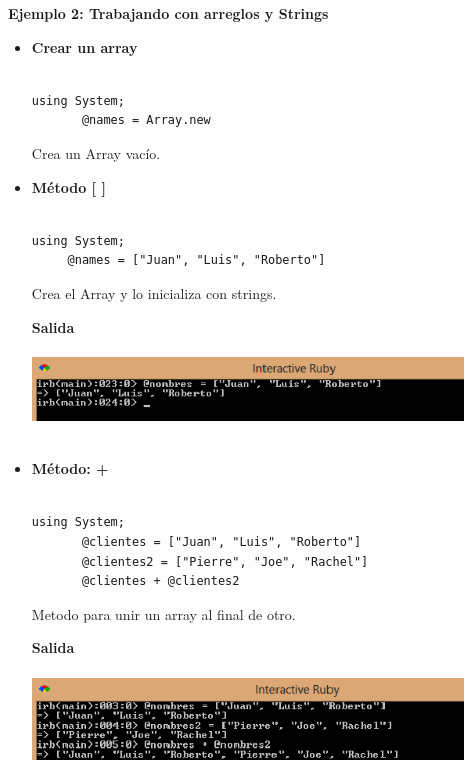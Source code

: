 \documentclass[11pt]{article} %
\begin{document}
 {\fontsize{14}{0} \bf Ejemplo 2: Trabajando con arreglos y Strings \\ }
\begin{itemize}

      \item {\bf Crear un array}\\\\
\begin{lstlisting}[frame=single]  % Start your code-block
using System;
       @names = Array.new
\end{lstlisting}
\begin{center}   
Crea un Array vacío.
\end{center}

      \item {\bf Método [ ]} \\\\
\begin{lstlisting}[frame=single]  % Start your code-block
using System;
     @names = ["Juan", "Luis", "Roberto"]
\end{lstlisting}
\begin{center}
Crea el Array y lo inicializa con strings.
\end{center}
\bf Salida\\\\
    \includegraphics[width=0.9\textwidth]{./imagenes/InicializarArray}\\\\

\newpage

      \item {\bf Método: +}\\\\
\begin{lstlisting}[frame=single]  % Start your code-block
using System;
       @clientes = ["Juan", "Luis", "Roberto"]
       @clientes2 = ["Pierre", "Joe", "Rachel"]
       @clientes + @clientes2
\end{lstlisting}
\begin{center}   
Metodo para unir un array al final de otro.
\end{center}
\bf Salida\\\\
    \includegraphics[width=0.9\textwidth]{./imagenes/Metodo+}\\\\
        


\end{itemize}
\end{document}
